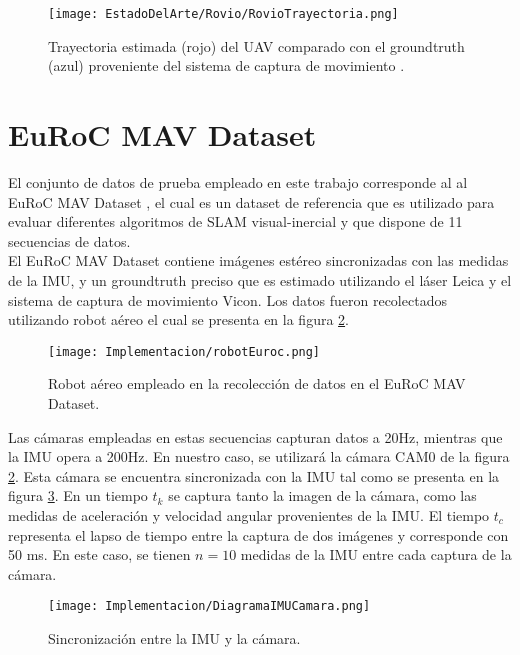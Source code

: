 \begin{figure}[H]
	\centering
	\texttt{[image: EstadoDelArte/Rovio/RovioTrayectoria.png]}
	\caption[Trayectoria estimada utilizando ROVIO]{Trayectoria estimada (rojo) del UAV comparado con el groundtruth (azul) proveniente del sistema de captura de movimiento .}
	\label{fig:RovioTrayectoria}
\end{figure}



\section{EuRoC MAV Dataset}
El conjunto de datos de prueba empleado en este trabajo corresponde al al EuRoC MAV Dataset \cite{euroc}, el cual es un dataset de referencia que es utilizado para evaluar diferentes algoritmos de SLAM visual-inercial y que dispone de 11 secuencias de datos. \\


El EuRoC MAV Dataset contiene imágenes estéreo sincronizadas con las medidas de la IMU,  y un groundtruth preciso que es estimado utilizando el láser Leica y el sistema de captura de movimiento Vicon. Los datos fueron recolectados utilizando robot aéreo el cual se presenta en la figura \ref{fig:robotEuroc}. \\

\begin{figure}[H]
	\centering
	\texttt{[image: Implementacion/robotEuroc.png]}
	\caption[Robot aéreo empleado en la recolección de datos en el EuRoC MAV Dataset]{Robot aéreo empleado en la recolección de datos en el EuRoC MAV Dataset.}
	\label{fig:robotEuroc}
\end{figure}

Las cámaras empleadas en estas secuencias capturan datos a 20Hz, mientras que la IMU opera a 200Hz. En nuestro caso, se utilizará la cámara CAM0 de la figura \ref{fig:robotEuroc}. Esta cámara se encuentra sincronizada con la IMU tal como se presenta en la figura \ref{fig:sincronizacionEuroc}. En un tiempo $t_k$ se captura tanto la imagen de la cámara, como las medidas de aceleración y velocidad angular provenientes de la IMU. El tiempo $t_c$ representa el lapso de tiempo entre la captura de dos imágenes y corresponde con 50 ms. En este caso, se tienen $n = 10$ medidas de la IMU entre cada captura de la cámara. \\

\begin{figure}[H]
	\centering
	\texttt{[image: Implementacion/DiagramaIMUCamara.png]}
	\caption[Sincronización entre la IMU y la cámara]{Sincronización entre la IMU y la cámara.}
	\label{fig:sincronizacionEuroc}
\end{figure}


